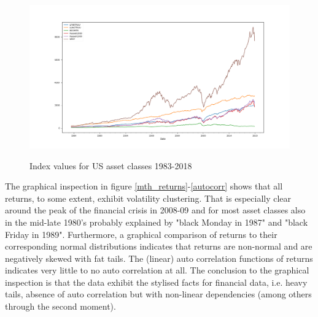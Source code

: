 \documentclass[11pt,a4paper,oneside]{article}
\begin{document}
\clearpage

\begin{figure}[ht]
\center
\caption{Index values for US asset classes 1983-2018}
\vspace{-4.9mm}
\label{index_levels}
\includegraphics[scale=0.5]{images/index_abs.png}
\begingroup
{}
\endgroup
\end{figure}






\clearpage


\noindent The graphical inspection in figure \ref{mth_returns}-\ref{autocorr} shows that all returns, to some extent, exhibit volatility clustering. That is especially clear around the peak of the financial crisis in 2008-09 and for most asset classes also in the mid-late 1980's probably explained by "black Monday in 1987" and "black Friday in 1989". Furthermore, a graphical comparison of returns to their corresponding normal distributions indicates that returns are non-normal and are negatively skewed with fat tails. The (linear) auto correlation functions of returns indicates very little to no auto correlation at all. The conclusion to the graphical inspection is that the data exhibit the stylised facts for financial data, i.e. heavy tails, absence of auto correlation but with non-linear dependencies (among others through the second moment)\cite{Cont}.  
\end{document}
